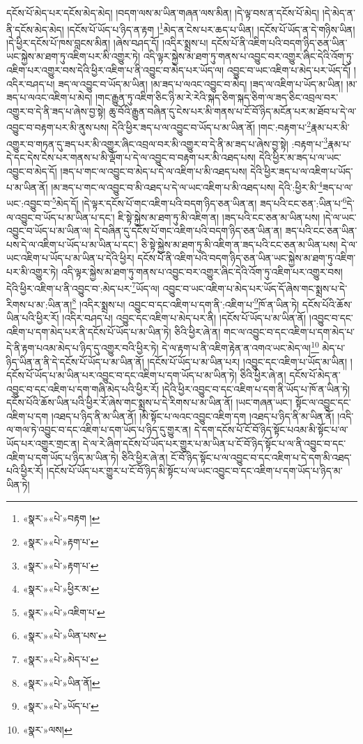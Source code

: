 དངོས་པོ་མེད་པར་དངོས་མེད་མེད། །བདག་ལས་མ་ཡིན་གཞན་ལས་མིན། །དེ་ལྟ་བས་ན་དངོས་པོ་མེད། །དེ་མེད་ན་ནི་དངོས་མེད་མེད། །དངོས་པོ་ཡོད་པ་ཉིད་ན་རྟག །\footnote{«སྣར་»«པེ་»བརྟག །}མེད་ན་ངེས་པར་ཆད་པ་ཡིན། །དངོས་པོ་ཡོད་ན་དེ་གཉིས་ཡིན། །དེ་ཕྱིར་དངོས་པོ་ཁས་བླངས་མིན། །ཞེས་བཤད་དོ། །འདིར་སྨྲས་པ། དངོས་པོ་ནི་འཇིག་པའི་བདག་ཉིད་ཅན་ཡིན་ཡང་སྐྱེས་མ་ཐག་ཏུ་འཇིག་པར་མི་འགྱུར་ཏེ། འདི་ལྟར་སྐྱེས་མ་ཐག་ཏུ་གནས་པ་འབྱུང་བར་འགྱུར་ཞིང་དེའི་འོག་ཏུ་འཇིག་པར་འགྱུར་བས་དེའི་ཕྱིར་འཇིག་པ་ནི་འབྱུང་བ་མེད་པར་ཡོད་ལ། འབྱུང་བ་ཡང་འཇིག་པ་མེད་པར་ཡོད་དོ། །འདིར་བཤད་པ། ཟད་ལ་འབྱུང་བ་ཡོད་མ་ཡིན། །མ་ཟད་པ་ལའང་འབྱུང་བ་མེད། །ཟད་ལ་འཇིག་པ་ཡོད་མ་ཡིན། །མ་ཟད་པ་ལའང་འཇིག་པ་མེད། །གང་རྒྱུན་ཏུ་འཇིག་ཅིང་ཉི་མ་རེ་རེའི་སྐད་ཅིག་སྐད་ཅིག་ལ་ཟད་ཅིང་འབྲལ་བར་འགྱུར་བ་དེ་ནི་ཟད་པ་ཞེས་བྱ་སྟེ། ཆུ་བོའི་རྒྱུན་བཞིན་དུ་ངེས་པར་མི་གནས་པ་ངོ་བོ་ཉིད་མངོན་པར་མ་ཐོབ་པ་དེ་ལ་འབྱུང་བ་བརྟག་པར་མི་ནུས་པས། དེའི་ཕྱིར་ཟད་པ་ལ་འབྱུང་བ་ཡོད་པ་མ་ཡིན་ནོ། །གང་:བརྟག་པ་\footnote{«སྣར་»«པེ་»རྟག་པ་}རྣམ་པར་མི་འགྱུར་བ་གཏན་དུ་ཟད་པར་མི་འགྱུར་ཞིང་འབྲལ་བར་མི་འགྱུར་བ་དེ་ནི་མ་ཟད་པ་ཞེས་བྱ་སྟེ། :བརྟག་པ་\footnote{«སྣར་»«པེ་»རྟག་པ་}རྣམ་པ་དེ་དང་དེས་ངེས་པར་གནས་པ་མི་ལྡོག་པ་དེ་ལ་འབྱུང་བ་བརྟག་པར་མི་འཐད་པས། དེའི་ཕྱིར་མ་ཟད་པ་ལ་ཡང་འབྱུང་བ་མེད་དོ། །ཟད་པ་གང་ལ་འབྱུང་བ་མེད་པ་དེ་ལ་འཇིག་པ་མི་འཐད་པས། དེའི་ཕྱིར་ཟད་པ་ལ་འཇིག་པ་ཡོད་པ་མ་ཡིན་ནོ། །མ་ཟད་པ་གང་ལ་འབྱུང་བ་མི་འཐད་པ་དེ་ལ་ཡང་འཇིག་པ་མི་འཐད་པས། དེའི་:ཕྱིར་མི་\footnote{«སྣར་»«པེ་»ཕྱིར་མ་}ཟད་པ་ལ་ཡང་:འབྱུང་བ་\footnote{«སྣར་»«པེ་»འཇིག་པ་}མེད་དོ། །དེ་ལྟར་དངོས་པོ་གང་འཇིག་པའི་བདག་ཉིད་ཅན་ཡིན་ན། ཟད་པའི་ངང་ཅན་:ཡིན་པ་\footnote{«སྣར་»«པེ་»ཡིན་པས་}དེ་ལ་འབྱུང་བ་ཡོད་པ་མ་ཡིན་པ་དང་། ཇི་སྟེ་སྐྱེས་མ་ཐག་ཏུ་མི་འཇིག་ན། །ཟད་པའི་ངང་ཅན་མ་ཡིན་པས། །དེ་ལ་ཡང་འབྱུང་བ་ཡོད་པ་མ་ཡིན་ལ། དེ་བཞིན་དུ་དངོས་པོ་གང་འཇིག་པའི་བདག་ཉིད་ཅན་ཡིན་ན། ཟད་པའི་ངང་ཅན་ཡིན་པས་དེ་ལ་འཇིག་པ་ཡོད་པ་མ་ཡིན་པ་དང་། ཅི་སྟེ་སྐྱེས་མ་ཐག་ཏུ་མི་འཇིག་ན་ཟད་པའི་ངང་ཅན་མ་ཡིན་པས། དེ་ལ་ཡང་འཇིག་པ་ཡོད་པ་མ་ཡིན་པ་དེའི་ཕྱིར། དངོས་པོ་ནི་འཇིག་པའི་བདག་ཉིད་ཅན་ཡིན་ཡང་སྐྱེས་མ་ཐག་ཏུ་འཇིག་པར་མི་འགྱུར་ཏེ། འདི་ལྟར་སྐྱེས་མ་ཐག་ཏུ་གནས་པ་འབྱུང་བར་འགྱུར་ཞིང་དེའི་འོག་ཏུ་འཇིག་པར་འགྱུར་བས། དེའི་ཕྱིར་འཇིག་པ་ནི་འབྱུང་བ་:མེད་པར་\footnote{«སྣར་»«པེ་»མེད་པ་}ཡོད་ལ། འབྱུང་བ་ཡང་འཇིག་པ་མེད་པར་ཡོད་དོ་ཞེས་གང་སྨྲས་པ་དེ་རིགས་པ་མ་:ཡིན་ན།\footnote{«སྣར་»«པེ་»ཡིན་ནོ།} །འདིར་སྨྲས་པ། འབྱུང་བ་དང་འཇིག་པ་དག་ནི་:འཇིག་པ་\footnote{«སྣར་»«པེ་»ཡོད་པ་}ཁོ་ན་ཡིན་ཏེ། དངོས་པོའི་ཆོས་ཡིན་པའི་ཕྱིར་རོ། །འདིར་བཤད་པ། འབྱུང་དང་འཇིག་པ་མེད་པར་ནི། །དངོས་པོ་ཡོད་པ་མ་ཡིན་ནོ། །འབྱུང་བ་དང་འཇིག་པ་དག་མེད་པར་ནི་དངོས་པོ་ཡོད་པ་མ་ཡིན་ཏེ། ཅིའི་ཕྱིར་ཞེ་ན། གང་ལ་འབྱུང་བ་དང་འཇིག་པ་དག་མེད་པ་དེ་ནི་རྟག་པའམ་མེད་པ་ཉིད་དུ་འགྱུར་བའི་ཕྱིར་ཏེ། དེ་ལ་རྟག་པ་ནི་འཇིག་རྟེན་ན་འགའ་ཡང་མེད་ལ།\footnote{«སྣར་»ལས།} མེད་པ་ཉིད་ཡིན་ན་ནི་དེ་དངོས་པོ་ཡོད་པ་མ་ཡིན་ནོ། །དངོས་པོ་ཡོད་པ་མ་ཡིན་པར། །འབྱུང་དང་འཇིག་པ་ཡོད་མ་ཡིན། །དངོས་པོ་ཡོད་པ་མ་ཡིན་པར་འབྱུང་བ་དང་འཇིག་པ་དག་ཡོད་པ་མ་ཡིན་ཏེ། ཅིའི་ཕྱིར་ཞེ་ན། དངོས་པོ་མེད་ན་འབྱུང་བ་དང་འཇིག་པ་དག་གཞི་མེད་པའི་ཕྱིར་རོ། །དེའི་ཕྱིར་འབྱུང་བ་དང་འཇིག་པ་དག་ནི་ཡོད་པ་ཁོ་ན་ཡིན་ཏེ། དངོས་པོའི་ཆོས་ཡིན་པའི་ཕྱིར་རོ་ཞེས་གང་སྨྲས་པ་དེ་རིགས་པ་མ་ཡིན་ནོ། །ཡང་གཞན་ཡང་། སྟོང་ལ་འབྱུང་དང་འཇིག་པ་དག །འཐད་པ་ཉིད་ནི་མ་ཡིན་ནོ། །མི་སྟོང་པ་ལའང་འབྱུང་འཇིག་དག །འཐད་པ་ཉིད་ནི་མ་ཡིན་ནོ། །འདི་ལ་གལ་ཏེ་འབྱུང་བ་དང་འཇིག་པ་དག་ཡོད་པ་ཉིད་དུ་གྱུར་ན། དེ་དག་དངོས་པོ་ངོ་བོ་ཉིད་སྟོང་པའམ་མི་སྟོང་པ་ལ་ཡོད་པར་འགྱུར་གྲང་ན། དེ་ལ་རེ་ཞིག་དངོས་པོ་ཡོད་པར་གྱུར་པ་མ་ཡིན་པ་ངོ་བོ་ཉིད་སྟོང་པ་ལ་ནི་འབྱུང་བ་དང་འཇིག་པ་དག་ཡོད་པ་ཉིད་མ་ཡིན་ཏེ། ཅིའི་ཕྱིར་ཞེ་ན། ངོ་བོ་ཉིད་སྟོང་པ་ལ་འབྱུང་བ་དང་འཇིག་པ་དེ་དག་མི་འཐད་པའི་ཕྱིར་རོ། །དངོས་པོ་ཡོད་པར་གྱུར་པ་ངོ་བོ་ཉིད་མི་སྟོང་པ་ལ་ཡང་འབྱུང་བ་དང་འཇིག་པ་དག་ཡོད་པ་ཉིད་མ་ཡིན་ཏེ། 